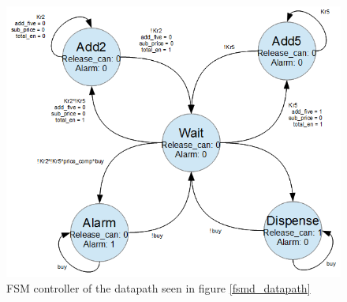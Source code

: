 \begin{figure}
    \center
    \includegraphics[scale=0.5]{pictures/fsm1_cola.png}
    \caption{FSM controller of the datapath seen in figure \ref{fsmd_datapath}}
    \label{cola_fsm}
\end{figure}


